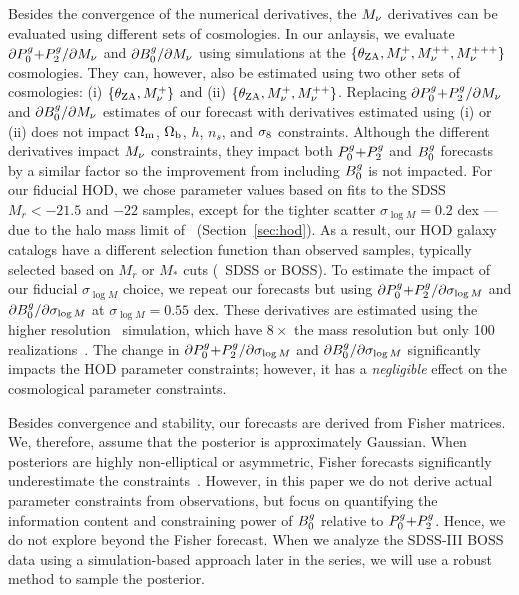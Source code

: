 Besides the convergence of the numerical derivatives, the $M_\nu$ derivatives
can be evaluated using different sets of cosmologies. In our anlaysis, we
evaluate ${\partial P^g_0{+}P^g_2}/{\partial M_\nu}$ and ${\partial B^g_0}/{\partial
M_\nu}$ using simulations at the $\{\theta_{\rm ZA}, M_\nu^+, M_\nu^{++},
M_\nu^{+++}\}$ cosmologies. They can, however, also be estimated using 
two other sets of cosmologies: (i) $\{\theta_{\rm ZA}, M_\nu^+\}$ and (ii)
$\{\theta_{\rm ZA}, M_\nu^+, M_\nu^{++}\}$. Replacing ${\partial
P^g_0{+}P^g_2}/{\partial M_\nu}$ and ${\partial B^g_0}/{\partial M_\nu}$ estimates of our
forecast with derivatives estimated using (i) or (ii) does not impact 
$\Omega_{\rm m}$, $\Omega_{\rm b}$, $h$, $n_s$, and $\sigma_8$ constraints. Although the different
derivatives impact $M_\nu$ constraints, they impact both $P^g_0{+}P^g_2$ and $B^g_0$
forecasts by a similar factor so the improvement from including $B^g_0$
is not impacted.
For our fiducial HOD, we chose parameter values based on \cite{zheng2007} 
fits to the SDSS $M_r < -21.5$  and $-22$ samples, except for the tighter
scatter $\sigma_{\log M} = 0.2$ dex --- due to the halo mass limit of 
\quij~(Section~\ref{sec:hod}). As a result, our HOD galaxy 
catalogs have a different selection function than observed samples, typically
selected based on $M_r$ or $M_*$ cuts (\eg~SDSS or BOSS). To estimate the impact
of our fiducial $\sigma_{\log M}$ choice, we repeat our forecasts but using 
${\partial P^g_0{+}P^g_2}/{\partial \sigma_{\log M}}$ and ${\partial B^g_0}/{\partial \sigma_{\log M}}$
at $\sigma_{\log M} = 0.55$ dex. These derivatives are estimated using the
higher resolution \quij~simulation, which have $8\times$ the mass resolution 
but only 100 realizations~\citep{villaescusa-navarro2019}. The change in 
${\partial P^g_0{+}P^g_2}/{\partial \sigma_{\log M}}$ and ${\partial
B^g_0}/{\partial \sigma_{\log M}}$ significantly impacts the HOD parameter
constraints; however, it has a {\em negligible} effect on the cosmological
parameter constraints. 

Besides convergence and stability, our forecasts are derived from Fisher
matrices. We, therefore, assume that the posterior is approximately Gaussian. 
When posteriors are highly non-elliptical or asymmetric, Fisher forecasts 
significantly underestimate the constraints~\citep{wolz2012}. However, in
this paper we do not derive actual parameter constraints from observations, 
but focus on quantifying the information content and constraining power of 
$B^g_0$ relative to
$P^g_0{+}P^g_2$. Hence, we do not explore beyond the Fisher forecast. When we analyze
the SDSS-III BOSS data using a simulation-based approach later in the series,
we will use a robust method to sample the posterior. 

